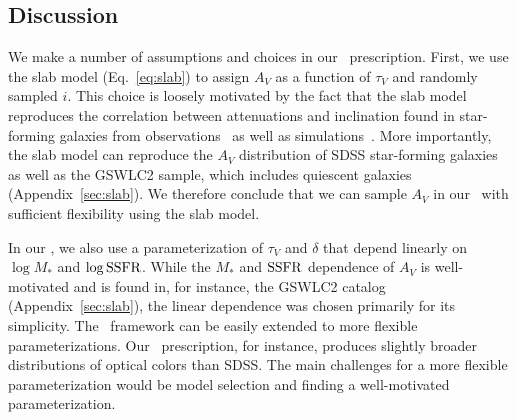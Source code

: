\subsection{Discussion}  
We make a number of assumptions and choices in our \eda~prescription. 
First, we use the slab model (Eq.~\ref{eq:slab}) to assign $A_V$ as a
function of $\tau_V$ and randomly sampled $i$. 
This choice is loosely motivated by the fact that the slab model reproduces
the correlation between attenuations and inclination found in star-forming
galaxies from observations~\citep{conroy2010b, wild2011, battisti2017,
salim2020} as well as simulations~\citep[\eg][]{chevallard2013,
narayanan2018, trayford2020}.
More importantly, the slab model can reproduce the $A_V$ distribution of
SDSS star-forming galaxies as well as the GSWLC2 sample, which includes
quiescent galaxies (Appendix~\ref{sec:slab}).
We therefore conclude that we can sample $A_V$ in our \eda~with sufficient
flexibility using the slab model. 

In our \eda, we also use a parameterization of $\tau_V$ and $\delta$ that
depend linearly on $\log M_*$ and $\log {\rm SSFR}$. 
While the $M_*$ and ${\rm SSFR}$ dependence of $A_V$ is well-motivated and is
found in, for instance, the \cite{salim2018} GSWLC2 catalog (Appendix~\ref{sec:slab}), 
the linear dependence was chosen primarily for its simplicity.
The \eda~framework can be easily extended to more flexible
parameterizations. 
Our \eda~prescription, for instance, produces slightly broader distributions of
optical colors than SDSS. 
The main challenges for a more flexible parameterization would be model
selection and finding a well-motivated parameterization. 

